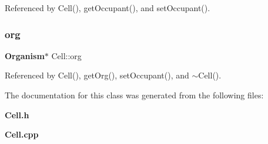 Referenced by Cell(), get\+Occupant(), and set\+Occupant().

\mbox{\label{classCell_acbab180cc71423ae9ebe9c39ea4c8945}} 
\subsubsection{org}
{\footnotesize\ttfamily \textbf{ Organism}$\ast$ Cell\+::org\hspace{0.3cm}{\ttfamily [private]}}



Referenced by Cell(), get\+Org(), set\+Occupant(), and $\sim$\+Cell().



The documentation for this class was generated from the following files\+:\begin{DoxyCompactItemize}
\item 
\textbf{ Cell.\+h}\item 
\textbf{ Cell.\+cpp}\end{DoxyCompactItemize}
